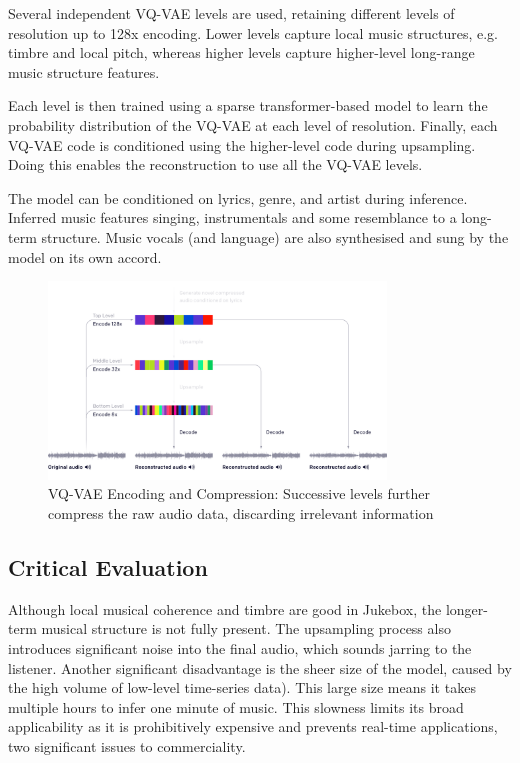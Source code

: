 Several independent VQ-VAE levels are used, retaining different levels of resolution up to 128x encoding. Lower levels capture local music structures, e.g. timbre and local pitch, whereas higher levels capture higher-level long-range music structure features.

Each level is then trained using a sparse transformer-based model to learn the probability distribution of the VQ-VAE at each level of resolution. Finally, each VQ-VAE code is conditioned using the higher-level code during upsampling. Doing this enables the reconstruction to use all the VQ-VAE levels.

The model can be conditioned on lyrics, genre, and artist during inference. Inferred music features singing, instrumentals and some resemblance to a long-term structure. Music vocals (and language) are also synthesised and sung by the model on its own accord.

\begin{figure}[H]
    \centering
    \includegraphics[width=0.8\textwidth]{literature_review/vq-vae.png}
    \caption{VQ-VAE Encoding and Compression: Successive levels further compress the raw audio data, discarding irrelevant information\cite{Jukebox}}
    \label{fig:jukebox_example}
\end{figure}

\subsection{Critical Evaluation}

Although local musical coherence and timbre are good in Jukebox, the longer-term musical structure is not fully present. The upsampling process also introduces significant noise into the final audio, which sounds jarring to the listener. Another significant disadvantage is the sheer size of the model, caused by the high volume of low-level time-series data). This large size means it takes multiple hours to infer one minute of music. This slowness limits its broad applicability as it is prohibitively expensive and prevents real-time applications, two significant issues to commerciality.

